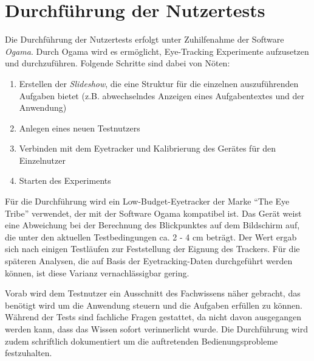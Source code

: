 \section{Durchführung der Nutzertests} \label{sec:testExecution}
Die Durchführung der Nutzertests erfolgt unter Zuhilfenahme der Software \textit{Ogama}. Durch Ogama wird es ermöglicht, Eye-Tracking Experimente aufzusetzen und durchzuführen. Folgende Schritte sind dabei von Nöten:\par
\begin{enumerate}
 \item Erstellen der \textit{Slideshow}, die eine Struktur für die einzelnen auszuführenden Aufgaben bietet (z.B. abwechselndes Anzeigen eines Aufgabentextes und der Anwendung)
 \item Anlegen eines neuen Testnutzers
 \item Verbinden mit dem Eyetracker und Kalibrierung des Gerätes für den Einzelnutzer
 \item Starten des Experiments
\end{enumerate}
Für die Durchführung wird ein Low-Budget-Eyetracker der Marke \enquote{The Eye Tribe} verwendet, der mit der Software Ogama kompatibel ist. Das Gerät weist eine Abweichung bei der Berechnung des Blickpunktes auf dem Bildschirm auf, die unter den aktuellen Testbedingungen ca. 2 - 4 cm beträgt. Der Wert ergab sich nach einigen Testläufen zur Feststellung der Eignung des Trackers. Für die späteren Analysen, die auf Basis der Eyetracking-Daten durchgeführt werden können, ist diese Varianz vernachlässigbar gering.\par
Vorab wird dem Testnutzer ein Ausschnitt des Fachwissens näher gebracht, das benötigt wird um die Anwendung steuern und die Aufgaben erfüllen zu können. Während der Tests sind fachliche Fragen gestattet, da nicht davon ausgegangen werden kann, dass das Wissen sofort verinnerlicht wurde. Die Durchführung wird zudem schriftlich dokumentiert um die auftretenden Bedienungsprobleme festzuhalten.\par
